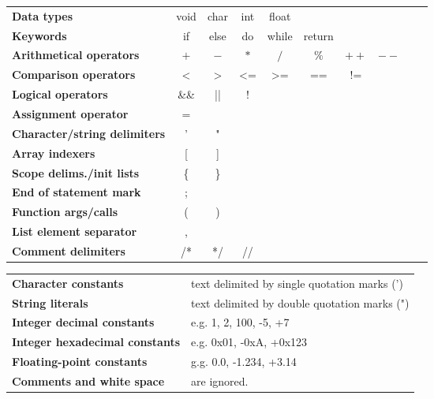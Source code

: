 \begin{tabular}{lccccccccc}
\textbf{Data types}                      & void & char & int & float &         &      &      &   &   \\
\textbf{Keywords}                        & if   & else & do  & while & return  &      &      &   &   \\
\textbf{Arithmetical operators}          & $+$  & $-$  & $*$ & $/$   & $\%$    & $++$ & $--$ &   &   \\
\textbf{Comparison operators}            & <    & >    & <=  & >=    & ==      & !=   &      &   &   \\
\textbf{Logical operators}               & \&\& & ||   & !   &       &         &      &      &   &   \\
\textbf{Assignment operator}             & =    &      &     &       &         &      &      &   &   \\
\textbf{Character/string delimiters}     & '    & "    &     &       &         &      &      &   &   \\
\textbf{Array indexers}                  & [    & ]    &     &       &         &      &      &   &   \\
\textbf{Scope delims./init lists}        & \{   & \}   &     &       &         &      &      &   &   \\
\textbf{End of statement mark}           & ;    &      &     &       &         &      &      &   &   \\
\textbf{Function args/calls}             & (    & )    &     &       &         &      &      &   &   \\
\textbf{List element separator}          & ,    &      &     &       &         &      &      &   &   \\
\textbf{Comment delimiters}              & /*   & */   & //  &       &         &      &      &   &   \\
\end{tabular}

\vspace*{1cm}

\begin{tabular}{ll}
\textbf{Character constants}            & text delimited by single quotation marks (') \\
\textbf{String literals}                & text delimited by double quotation marks (") \\
\textbf{Integer decimal constants}      & e.g. 1, 2, 100, -5, +7                       \\
\textbf{Integer hexadecimal constants}  & e.g. 0x01, -0xA, +0x123                      \\
\textbf{Floating-point constants}       & g.g. 0.0, -1.234, +3.14                      \\
\textbf{Comments and white space}       & are ignored.                                 \\
\end{tabular}

